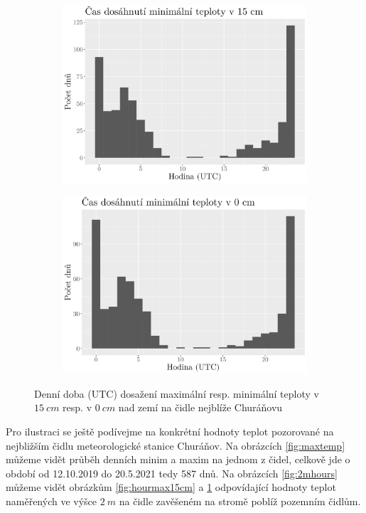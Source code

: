 \begin{figure}
\begin{subfigure}{0.45\textwidth}
  \includegraphics[width=\textwidth]{img/hist_hourmin15cm.png}
		\caption{}
		\label{fig:hourmin15cm}
	\end{subfigure}
	\hfill
	\begin{subfigure}{0.45\textwidth}
  \includegraphics[width=\textwidth]{img/hist_hourmin0cm.png}
		\caption{}
		\label{fig:hourmin0cm}
	\end{subfigure}
	\caption{Denní doba (UTC) dosažení maximální resp. minimální teploty v $\SI{15}{cm}$ resp. v $\SI{0}{cm}$ nad zemí na čidle nejblíže Churáňovu}
	\label{fig:hours}
\end{figure}

Pro ilustraci se ještě podívejme na konkrétní hodnoty teplot pozorované na nejbližším čidlu meteorologické stanice Churáňov. Na obrázcích \ref{fig:maxtemp} můžeme vidět průběh denních minim a maxim na jednom z čidel, celkově jde o období od 12.10.2019 do 20.5.2021 tedy 587 dnů. Na obrázcích \ref{fig:2mhours} můžeme vidět obrázkům \ref{fig:hourmax15cm} a \ref{fig:hourmin15cm} odpovídající hodnoty teplot naměřených ve výšce $\SI{2}{m}$ na čidle zavěšeném na stromě poblíž pozemním čidlům.

